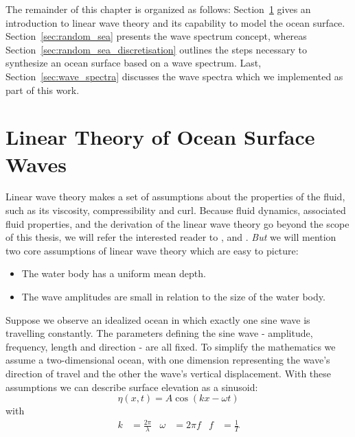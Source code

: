 The remainder of this chapter is organized as follows:
Section~\ref{sec:linear_theory_ocean_waves} gives an introduction to linear wave theory
and its capability to model the ocean surface. Section~\ref{sec:random_sea}
presents the wave spectrum concept, whereas Section~\ref{sec:random_sea_discretisation}
outlines the steps necessary to synthesize an ocean surface based on
a wave spectrum.
Last, Section~\ref{sec:wave_spectra} discusses the wave spectra which we
implemented as part of this work.

\section{Linear Theory of Ocean Surface Waves}
\label{sec:linear_theory_ocean_waves}
Linear wave theory makes a set of assumptions about the properties of the fluid, such as its viscosity,
compressibility and curl. Because fluid dynamics, associated fluid properties, and the derivation
of the linear wave theory go beyond the scope of this thesis, we will refer the interested reader
to \citet{book:airy1845tides}, \citet{book:batchelor2000introduction}
and \citet{book:kinsman2002wind}.
\emph{But} we will mention two core assumptions of linear wave theory which are easy to picture:
\begin{itemize}
 \item The water body has a uniform mean depth.
 \item The wave amplitudes are small in relation to the size of the water body.
\end{itemize}
Suppose we observe an idealized ocean in which exactly one sine wave is travelling constantly.
The parameters defining the sine wave - amplitude, frequency, length and direction - are all fixed.
To simplify the mathematics we assume a two-dimensional ocean, with one
dimension representing the wave's direction of travel and the  other the wave's
vertical displacement. With these assumptions we can describe surface elevation
as a sinusoid:
%
\begin{equation}
\label{eq:sinusoid}
 \eta(x, t) = A\cos(kx - \omega t)
\end{equation}
with
\begin{align*}
\label{eq:sinusoid_parameters}
 k &= \frac{2\pi}{\lambda} & \omega &= 2\pi f & f &= \frac{1}{T}
\end{align*}
